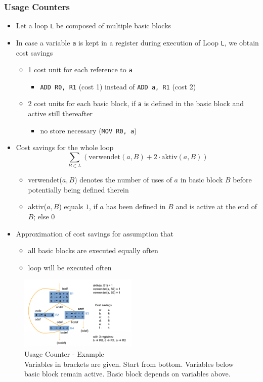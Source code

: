 \subsubsection{Usage Counters}
\begin{itemize}
	\item Let a loop \verb|L| be composed of multiple basic blocks
	\item In case a variable \verb|a| is kept in a register during execution of Loop \verb|L|, we obtain cost savings
\begin{itemize}
	\item 1 cost unit for each reference to \verb|a|
\begin{itemize}
	\item \verb|ADD R0, R1| (cost 1) instead of \verb|ADD a, R1| (cost 2)
\end{itemize}
	\item 2 cost units for each basic block, if \verb|a| is defined in the basic block and active still thereafter
\begin{itemize}
	\item no store necessary (\verb|MOV R0, a|)
\end{itemize}
\end{itemize}
	\item Cost savings for the whole loop
$$
	\sum_{B\in L} (\text{verwendet}(a, B)+2\cdot \text{aktiv}(a, B))
$$
\begin{itemize}
	\item verwendet($a, B$) denotes the number of uses of $a$ in basic block $B$ before potentially being defined therein 
	\item aktiv($a, B$) equals $1$, if $a$ has been defined in $B$ and is active at the end of $B$; else $0$
\end{itemize}
	\item Approximation of cost savings for assumption that
\begin{itemize}
	\item all basic blocks are executed equally often
	\item loop will be executed often
\end{itemize}
\end{itemize}

\begin{figure}
	\begin{center}
		\includegraphics[width=0.5\textwidth]{images/Usage_counter.png}
		\caption{
			Usage Counter - Example \\
			Variables in brackets are given. Start from bottom. Variables below basic block remain active. Basic block depends on variables above.  
		}
	\end{center}
\end{figure}

